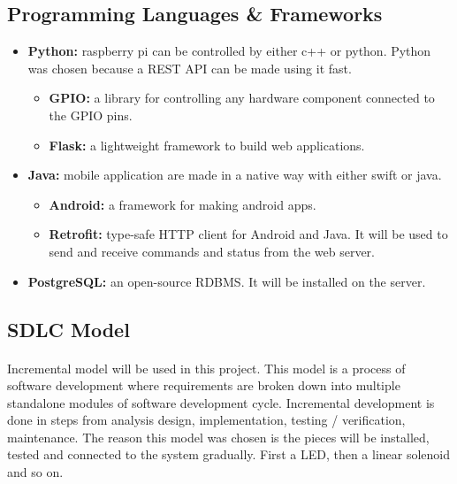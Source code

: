 \documentclass[a4paper, 12pt, oneside]{book}
\newcommand\boldcolor[1]{\textcolor{bold}{\textbf{#1}}}
\begin{document}
			\subsection{Programming Languages \& Frameworks}
				\begin{itemize}
					
					\item \boldcolor{Python:} raspberry pi can be controlled by either c++ or python. Python was chosen because a REST API can be made using it fast.
		 				\begin{itemize}
		 					\item \boldcolor{GPIO:} a library for controlling any hardware component connected to the GPIO pins.
		 					\item \boldcolor{Flask:} a lightweight framework to build web applications.
						\end{itemize}
					\item \boldcolor{Java:} mobile application are made in a native way with either swift or java.
						\begin{itemize}
							\item \boldcolor{Android:} a framework for making android apps.
							\item \boldcolor{Retrofit:} type-safe HTTP client for Android and Java. It will be used to send and receive commands and status from the web server.
							
						\end{itemize}
					\item \boldcolor{PostgreSQL:} an open-source RDBMS. It will be installed on the server.
				\end{itemize}
			
			\subsection{SDLC Model}
			\paragraph{} Incremental model will be used in this project. This model is a process of software development where requirements are broken down into multiple standalone modules of software development cycle. Incremental development is done in steps from analysis design, implementation, testing / verification, maintenance\cite{sdlc}. The reason this model was chosen is the pieces will be installed, tested and connected to the system gradually. First a LED, then a linear solenoid and so on.
			
\end{document}
